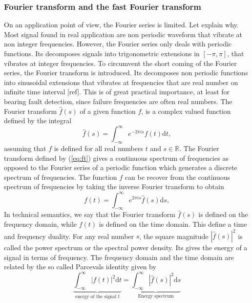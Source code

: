 \documentclass[../Main/thesis.tex]{subfiles}
\begin{document}
\subsubsection{Fourier transform and the fast Fourier transform}
\label{sec:fouurier-transform}
On an application point of view, the Fourier series is limited. Let explain why. Most signal found in real application are non periodic waveform that vibrate at non integer frequencies. However, the Fourier series only deals with periodic functions. Its decomposes signals into trigonometric extensions in $[-\pi, \pi]$, that vibrates at integer frequencies. To circumvent the short coming of the Fourier series, the Fourier transform is introduced. Its decomposes non periodic functions into sinusoidal extensions that vibrates at frequencies that are real number on infinite time interval [ref]. This is of great practical importance, at least for bearing fault detection, since failure frequencies are often real numbers.
\justify
The Fourier transform $\hat{f}(s)$ of a given function $f$, is a complex valued function defined by the integral
\begin{equation}\label{eq:ft}
   \hat{f}(s) = \int_{-\infty}^{\infty}e^{-2\pi i s}f(t)\mathrm{d}t,
\end{equation}
assuming that $f$ is defined for all real numbers $t$ and $s\in\mathbb{R}$. The Fourier transform defined by (\ref{eq:ft}) gives a continuous spectrum of frequencies as opposed to the Fourier series of a periodic function which generates a discrete spectrum of frequencies. The function $f$ can be recover from the continuous spectrum of frequencies by taking the inverse Fourier transform to obtain
\begin{equation}\label{eq:ift}
f(t) = \int_{-\infty}^{\infty}e^{2\pi i s}\hat{f}(s)\mathrm{d}s,
\end{equation}
In technical semantics, we say that the Fourier transform $\hat{f}(s)$ is defined on the frequency domain, while $f(t)$ is defined on the time domain. This define a time and frequency duality. For any real number $s$, the square magnitude $|\hat{f}(s)|^{2}$ is called the power spectrum or the spectral power density. Its gives the energy of a signal in terms of frequency. The frequency domain and the time domain are related by the so called Parcevals identity
given by 
\begin{equation}\label{eq:parceval}
\underbrace{\int_{-\infty}^{\infty}|f(t)|^{2}\mathrm{d}t}_{\text{energy of the signal f}} = \underbrace{\int_{-\infty}^{\infty}|\hat{f}(s)|^{2}\mathrm{d}s}_{\text{Energy spectrum}}
\end{equation}
\end{document}
